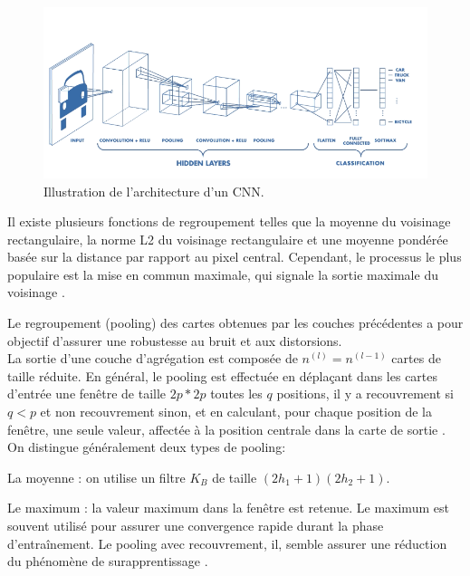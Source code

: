 \begin{figure}[H]%
	\centering
	\includegraphics[width=\textwidth]{images/cnn_complet}
	\caption{Illustration de l'architecture d'un CNN.}
	\label{fig:cnn_complet}
\end{figure}

Il existe plusieurs fonctions de regroupement telles que la moyenne du voisinage rectangulaire, la norme L2 du voisinage rectangulaire et une moyenne pondérée basée sur la distance par rapport au pixel central. Cependant, le processus le plus populaire est la mise en commun maximale, qui signale la sortie maximale du voisinage \cite{goodfellow2016deep}.

Le regroupement (pooling) des cartes obtenues par les couches précédentes a pour objectif d'assurer une robustesse au bruit et aux distorsions.\\
La sortie d'une couche d'agrégation est composée de $n^{(l)} = n^{(l - 1)}$ cartes de taille réduite. En général, le pooling est effectuée en déplaçant dans les cartes d'entrée une fenêtre de taille $2p * 2p$ toutes les $q$ positions, il y a recouvrement si $q < p$ et non recouvrement sinon, et en calculant, pour chaque position de la fenêtre, une seule valeur, affectée à la position centrale dans la carte de sortie \cite{antoine2018apprentissage}. On distingue généralement deux types de pooling:

\begin{list}{--}{}
	\item La moyenne : on utilise un filtre $K_{B}$ de taille $(2h_{1} + 1)(2h_{2} + 1)$.
	\item Le maximum : la valeur maximum dans la fenêtre est retenue. Le maximum est souvent utilisé pour assurer une convergence rapide durant la phase d'entraînement. Le pooling avec recouvrement, il, semble assurer une réduction du phénomène de surapprentissage \cite{antoine2018apprentissage}.  
\end{list}




